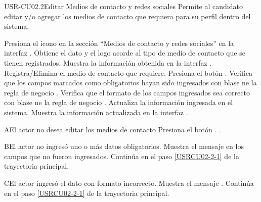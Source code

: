\begin{UseCase}[]{USR-CU02.2}{Editar Medios de contacto y redes sociales}{
	Permite al candidato editar y/o agregar los medios de contacto que requiera para su perfil dentro del sistema.
}
\end{UseCase}

\begin{UCtrayectoria}
	\UCpaso [\UCactor] Presiona el ícono \IUEditar{} en la sección ``Medios de contacto y redes sociales'' en la interfaz . 
	\UCpaso Obtiene el dato y el logo acorde al tipo de medio de contacto que se tienen registrados.
	\UCpaso [\UCsist] Muestra la información obtenida en la interfaz .
	\UCpaso \label{USRCU02-2-1} Registra/Elimina el medio de contacto que requiere.
	\UCpaso [\UCsist] Presiona el botón .
	\UCpaso Verifica que los campos marcados como obligatorios hayan sido ingresados con blase ne la regla de negocio .
	\UCpaso Verifica que el formato de los campos ingresados sea correcto con blase ne la regla de negocio .
	\UCpaso Actualiza la información ingresada en el sistema.
	\UCpaso Muestra la información actualizada en la interfaz . 
\end{UCtrayectoria}

\begin{UCtrayectoriaA}{A}{El actor no desea editar los medios de contacto}
	\UCpaso [\UCsist] Presiona el botón .
	.
\end{UCtrayectoriaA} 

\begin{UCtrayectoriaA}{B}{El actor no ingresó uno o más datos obligatorios.}
	\UCpaso [\UCsist] Muestra el mensaje  en los campos que no fueron ingresados.
	\UCpaso [\UCsist] Continúa en el paso \ref{USRCU02-2-1} de la trayectoria principal.
\end{UCtrayectoriaA} 

\begin{UCtrayectoriaA}{C}{El actor ingresó el dato con formato incorrecto.}
	\UCpaso [\UCsist] Muestra el mensaje .
	\UCpaso [\UCsist] Continúa en el paso \ref{USRCU02-2-1} de la trayectoria principal.
\end{UCtrayectoriaA}




